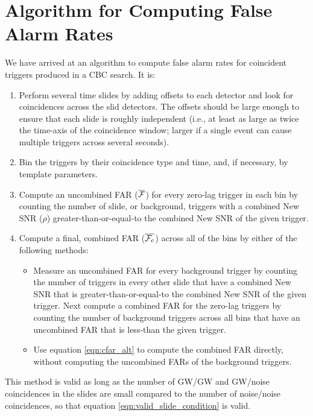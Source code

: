 \section{Algorithm for Computing False Alarm Rates}
\label{sec:far_slide_algorithm}
We have arrived at an algorithm to compute false alarm rates for coincident triggers produced in a \ac{CBC} search. It is:

\begin{enumerate}
\item{Perform several time slides by adding offsets to each detector and look for coincidences across the slid detectors. The offsets should be large enough to ensure that each slide is roughly independent (i.e., at least as large as twice the time-axis of the coincidence window; larger if a single event can cause multiple triggers across several seconds).}
\item{Bin the triggers by their coincidence type and time, and, if necessary, by template parameters.}
\item{Compute an uncombined \ac{FAR} ($\overline{\mathcal{F}}$) for every zero-lag trigger in each bin by counting the number of slide, or background, triggers with a combined New \ac{SNR} ($\rho$) greater-than-or-equal-to the combined New \ac{SNR} of the given trigger.}
\item{Compute a final, combined \ac{FAR} ($\overline{\mathcal{F}_{\mathrm{c}}}$) across all of the bins by either of the following methods:
    \begin{itemize}
    \item{Measure an uncombined \ac{FAR} for every background trigger by counting the number of triggers in every other slide that have a combined New \ac{SNR} that is greater-than-or-equal-to the combined New \ac{SNR} of the given trigger. Next compute a combined \ac{FAR} for the zero-lag triggers by counting the number of background triggers across all bins that have an uncombined \ac{FAR} that is less-than the given trigger.}
    \item{Use equation \ref{eqn:cfar_alt} to compute the combined \ac{FAR} directly, without computing the uncombined \acp{FAR} of the background triggers.}
    \end{itemize}}
\end{enumerate}
This method is valid as long as the number of \ac{GW}/\ac{GW} and \ac{GW}/noise coincidences in the slides are small compared to the number of noise/noise coincidences, so that equation \ref{eqn:valid_slide_condition} is valid.




